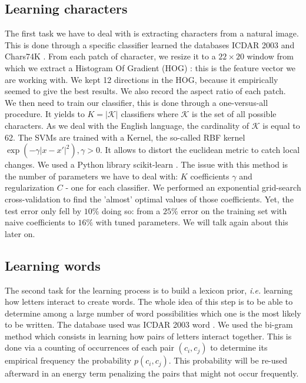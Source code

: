\documentclass[10pt,a4paper]{article}
\begin{document}
\subsection{Learning characters}

The first task we have to deal with is extracting characters from a natural image. This is done through a specific classifier learned the databases ICDAR 2003 \cite{ICDARchar} and Chars74K \cite{Char74K}. From each patch of character, we resize it to a $22\times 20$ window from which we extract a Histogram Of Gradient (HOG) \cite{Dal2005}: this is the feature vector we are working with. We kept 12 directions in the HOG, because it empirically seemed to give the best results. We also record the aspect ratio of each patch. \\

We then need to train our classifier, this is done through a one-versus-all procedure. It yields to $K = |\mathcal{K}|$ classifiers where $\mathcal{K}$ is the set of all possible characters. As we deal with the English language, the cardinality of $\mathcal{K}$ is equal to 62. The SVMs are trained with a Kernel, the so-called RBF kernel $\exp(-\gamma |x-x'|^2), \gamma > 0$. It allows to distort the euclidean metric to catch local changes. We used a Python library scikit-learn \cite{scikit}. The issue with this method is the number of parameters we have to deal with: $K$ coefficients $\gamma$ and regularization $C$ - one for each classifier. We performed an exponential grid-search cross-validation to find the 'almost' optimal values of those coefficients. Yet, the test error only fell by $10\%$ doing so: from a $25\%$ error on the training set with naive coefficients to $16\%$ with tuned parameters. We will talk again about this later on. 


\subsection{Learning words}

The second task for the learning process is to build a lexicon prior, \emph{i.e.} learning how letters interact to create words. The whole idea of this step is to be able to determine among a large number of word possibilities which one is the most likely to be written. The database used was ICDAR 2003 word \cite{ICDARword}. We used the bi-gram method which consists in learning how pairs of letters interact together. This is done via a counting of occurrences of each pair $(c_i,c_j)$ to determine its empirical frequency the probability $p(c_i,c_j)$. This probability will be re-used afterward in an energy term penalizing the pairs that might not occur frequently. 
\end{document}
